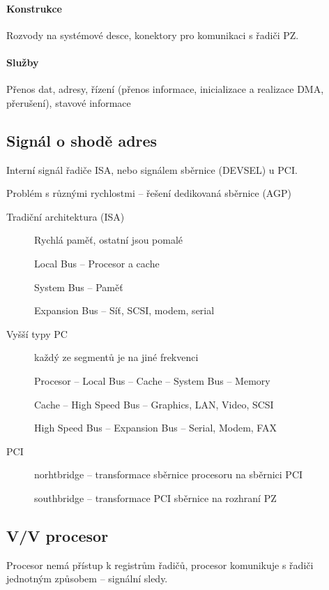 \documentclass[a4wide]{report}
\begin{document}
\paragraph{Konstrukce} Rozvody na systémové desce, konektory pro komunikaci s řadiči PZ.

\paragraph{Služby} Přenos dat, adresy, řízení (přenos informace, inicializace a realizace DMA, přerušení), stavové informace

\subsection{Signál o shodě adres}
Interní signál řadiče ISA, nebo signálem sběrnice (DEVSEL) u PCI.

Problém s různými rychlostmi -- řešení dedikovaná sběrnice (AGP)

\begin{description}
	\item[Tradiční architektura (ISA)] Rychlá paměť, ostatní jsou pomalé
	
	Local Bus -- Procesor a cache
	
	System Bus -- Paměť
	
	Expansion Bus -- Síť, SCSI, modem, serial
	
	\item[Vyšší typy PC] každý ze segmentů je na jiné frekvenci
	
	Procesor -- Local Bus -- Cache -- System Bus -- Memory
	
	Cache -- High Speed Bus -- Graphics, LAN, Video, SCSI
	
	High Speed Bus -- Expansion Bus -- Serial, Modem, FAX
	
	\item[PCI]
	
	norhtbridge -- transformace sběrnice procesoru na sběrnici PCI
	
	southbridge -- transformace PCI sběrnice na rozhraní PZ
\end{description}

\subsection{V/V procesor}

Procesor nemá přístup k registrům řadičů, procesor komunikuje s řadiči jednotným způsobem -- signální sledy.
\end{document}
